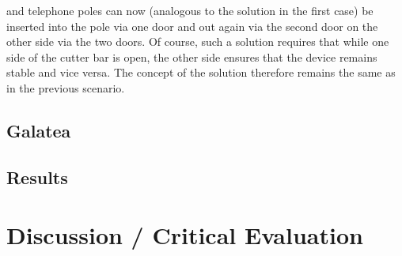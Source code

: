 \documentclass[12pt]{article}
\begin{document}
and telephone poles can now (analogous to the solution in the first case) be inserted into the pole via one door and out again via the second door on the other side via the two doors. Of course, such a solution requires that while one side of the cutter bar is open, the other side ensures that the device remains stable and vice versa. The concept of the solution therefore remains the same as in the previous scenario.

\subsection{Galatea}

\subsection{Results}


\section{Discussion / Critical Evaluation}

\noindent




\end{document}
